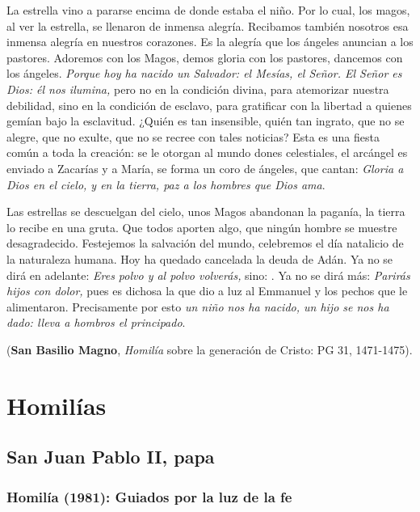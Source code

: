 			\begin{patercite}
				La estrella vino a pararse encima de donde estaba el niño. Por lo cual, los magos, al ver la estrella, se llenaron de inmensa alegría. Recibamos también nosotros esa inmensa alegría en nuestros corazones. Es la alegría que los ángeles anuncian a los pastores. Adoremos con los Magos, demos gloria con los pastores, dancemos con los ángeles. \emph{Porque hoy ha nacido un Salvador: el Mesías, el Señor. El Señor es Dios: él nos ilumina,} pero no en la condición divina, para atemorizar nuestra debilidad, sino en la condición de esclavo, para gratificar con la libertad a quienes gemían bajo la esclavitud. ¿Quién es tan insensible, quién tan ingrato, que no se alegre, que no exulte, que no se recree con tales noticias? Esta es una fiesta común a toda la creación: se le otorgan al mundo dones celestiales, el arcángel es enviado a Zacarías y a María, se forma un coro de ángeles, que cantan: \emph{Gloria a Dios en el cielo, y en la tierra, paz a los hombres que Dios ama}.
				
				Las estrellas se descuelgan del cielo, unos Magos abandonan la paganía, la tierra lo recibe en una gruta. Que todos aporten algo, que ningún hombre se muestre desagradecido. Festejemos la salvación del mundo, celebremos el día natalicio de la naturaleza humana. Hoy ha quedado cancelada la deuda de Adán. Ya no se dirá en adelante: \emph{Eres polvo y al polvo volverás,} sino: . Ya no se dirá más: \emph{Parirás hijos con dolor,} pues es dichosa la que dio a luz al Emmanuel y los pechos que le alimentaron. Precisamente por esto \emph{un niño nos ha nacido, un hijo se nos ha dado: lleva a hombros el principado}.
				
				(\textbf{San Basilio Magno}, \emph{Homilía} sobre la generación de Cristo: PG 31, 1471-1475).
			\end{patercite}

\newsection

	\section{Homilías}
	
		\subsection{San Juan Pablo II, papa}
		
			\subsubsection{Homilía (1981): Guiados por la luz de la fe}
			

